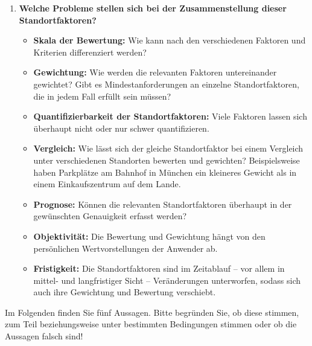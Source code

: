 {\begin{enumerate}[label=(\alph*)]
    \item \textbf{Welche Probleme stellen sich bei der Zusammenstellung dieser Standortfaktoren?}

    \begin{itemize}
        \item \textbf{Skala der Bewertung:} Wie kann nach den verschiedenen Faktoren und Kriterien differenziert werden?
        \item \textbf{Gewichtung:} Wie werden die relevanten Faktoren untereinander gewichtet? Gibt es Mindestanforderungen an einzelne Standortfaktoren, die in jedem Fall erfüllt sein müssen?
        \item \textbf{Quantifizierbarkeit der Standortfaktoren:} Viele Faktoren lassen sich überhaupt nicht oder nur schwer quantifizieren.
        \item \textbf{Vergleich:} Wie lässt sich der gleiche Standortfaktor bei einem Vergleich unter verschiedenen Standorten bewerten und gewichten? Beispielsweise haben Parkplätze am Bahnhof in München ein kleineres Gewicht als in einem Einkaufszentrum auf dem Lande.
        \item \textbf{Prognose:} Können die relevanten Standortfaktoren überhaupt in der gewünschten Genauigkeit erfasst werden?
        \item \textbf{Objektivität:} Die Bewertung und Gewichtung hängt von den persönlichen Wertvorstellungen der Anwender ab.
        \item \textbf{Fristigkeit:} Die Standortfaktoren sind im Zeitablauf – vor allem in mittel- und langfristiger Sicht – Veränderungen unterworfen, sodass sich auch ihre Gewichtung und Bewertung verschiebt.
    \end{itemize}
\end{enumerate}
}

Im Folgenden finden Sie fünf Aussagen. Bitte begründen Sie, ob diese stimmen, zum Teil beziehungsweise unter bestimmten Bedingungen stimmen oder ob die Aussagen falsch sind!\\

